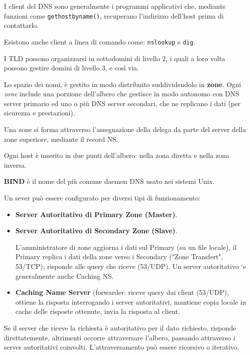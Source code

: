         I client del DNS sono generalmente i programmi applicativi che, mediante funzioni come \verb:gethostbyname():, recuperano l'indirizzo dell'host prima di contattarlo.

        Esistono anche client a linea di comando come: \verb:nslookup: e \verb:dig:.

        I TLD possono organizzarsi in sottodomini di livello 2, i quali a loro volta possono gestire domini di livello 3, e così via.

        Lo spazio dei nomi, è gestito in modo distribuito suddividendolo in \textbf{zone}. Ogni \textit{zone} include una porzione dell'albero che gestisce in modo autonomo con DNS server primario ed uno o più DNS server secondari, che ne replicano i dati (per sicurezza e prestazioni).

        Una zone si forma attraverso l'assegnazione della delega da parte del server della zone superiore, mediante il record NS.

        Ogni host è inserito in due punti dell'albero: nella zona diretta e nella zona inversa.

        \textbf{BIND} è il nome del più comune daemon DNS usato nei sistemi Unix.

        Un sever può essere configurato per diversi tipi di funzionamento:
        \begin{itemize}
            \item \textbf{Server Autoritativo di Primary Zone (Master)}.
            \item \textbf{Server Autoritativo di Secondary Zone (Slave)}.
            
            L'amministratore di zone aggiorna i dati sul Primary (su un file locale), il Primary replica i dati della zone verso i Secondary ("Zone Transfert", 53/TCP); risponde alle query che riceve (53/UDP).
            Un server autoritativo `e generalmente anche Caching NS.
            \item \textbf{Caching Name Server} (forwarder: riceve query dai client (53/UDP), ottiene la risposta interrogando i server autoritativi, mantiene copia locale in cache delle risposte ottenute, invia la risposta al client.
        \end{itemize}

        Se il server che riceve la richiesta è autoritativo per il dato richiesto, risponde direttatemente, altrimenti occorre attraversare l'albero, passando attraverso i server autoritativi coinvolti. L'attraversamento può essere ricorsivo o iterativo.

